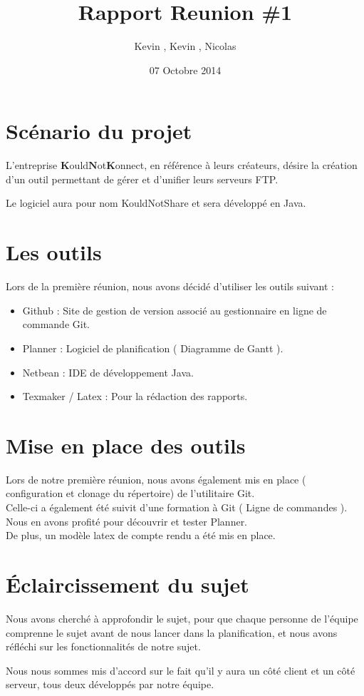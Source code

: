 \documentclass{article}
\title{Rapport Reunion \#1}
\author{Kevin \bsc{Bascol}, Kevin \bsc{Laoussing}, Nicolas \bsc{Reynaud}}
\date{07 Octobre 2014}
\begin{document}
\maketitle
\newpage

\renewcommand{\contentsname}{Sommaire}
\tableofcontents
\newpage

\section{Scénario du projet}

L'entreprise $\textbf{K}$ould$\textbf{N}$ot$\textbf{K}$onnect, en référence à leurs créateurs, désire la création d'un outil permettant de gérer et d'unifier leurs serveurs FTP.

Le logiciel aura pour nom KouldNotShare et sera développé en Java.

\section{Les outils}

Lors de la première réunion, nous avons décidé d'utiliser les outils suivant : 
\begin{itemize}
	\item Github : Site de gestion de version associé au gestionnaire en ligne de commande Git.
	\item Planner : Logiciel de planification ( Diagramme de Gantt ).
	\item Netbean : IDE de développement Java.
	\item Texmaker / Latex : Pour la rédaction des rapports.
\end{itemize}

\section{Mise en place des outils}

Lors de notre première réunion, nous avons également mis en place ( configuration et clonage du répertoire) de l'utilitaire Git. \\
Celle-ci a également été suivit d'une formation à Git ( Ligne de commandes ). \\

Nous en avons profité pour découvrir et tester Planner. \\
De plus, un modèle latex de compte rendu a été mis en place. \\

\section{Éclaircissement du sujet}

Nous avons cherché à approfondir le sujet, pour que chaque personne de l'équipe comprenne le sujet avant de nous lancer dans la planification, et nous avons réfléchi sur les fonctionnalités de notre sujet.\linebreak

Nous nous sommes mis d'accord sur le fait qu'il y aura un côté client et un côté serveur, tous deux développés par notre équipe.
\end{document}
